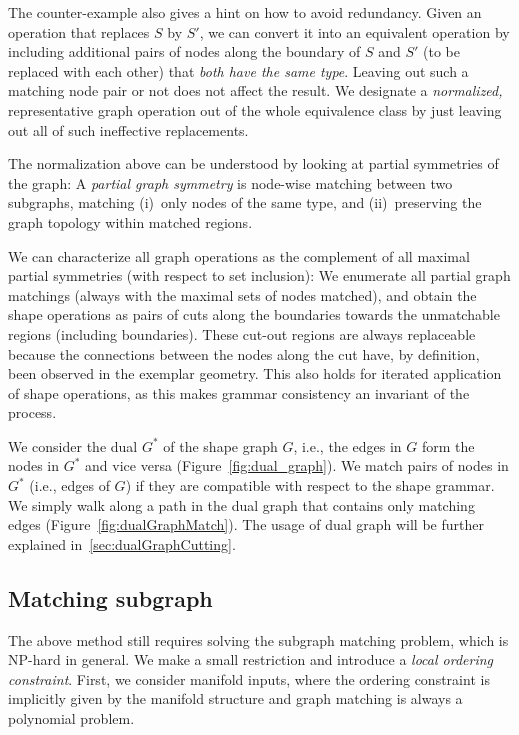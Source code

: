 The counter-example also gives a hint on how to avoid redundancy. Given an operation that replaces $S$ by $S'$, we can convert it into an equivalent operation by including additional pairs of nodes along the boundary of $S$ and $S'$ (to be replaced with each other) that \emph{both have the same type}. Leaving out such a matching node pair or not does not affect the result. We designate a \emph{normalized,} representative graph operation out of the whole equivalence class by just leaving out all of such ineffective replacements.


 The normalization above can be understood by looking at partial symmetries of the graph: A \emph{partial graph symmetry} is node-wise matching between two subgraphs, matching (i)~only nodes of the same type, and (ii)~preserving the graph topology within  matched regions.


We can characterize all graph operations as the complement of all maximal partial symmetries (with respect to set inclusion): We enumerate all partial graph matchings (always with the maximal sets of nodes matched), and obtain the shape operations as pairs of cuts along the boundaries towards the unmatchable regions (including boundaries).
%
These cut-out regions are always replaceable because the connections between the nodes along the cut have, by definition, been observed in the exemplar geometry. This also holds for iterated application of shape operations, as this makes grammar consistency an invariant of the process.

We consider the dual $G^*$ of the shape graph $G$, i.e., the edges in $G$ form the nodes in $G^*$ and vice versa (Figure~\ref{fig:dual_graph}). We match pairs of nodes in $G^*$ (i.e., edges of $G$) if they are compatible with respect to the shape grammar. We simply walk along a path in the dual graph that contains only matching edges (Figure~\ref{fig:dualGraphMatch}). The usage of dual graph will be further explained in~\ref{sec:dualGraphCutting}.

\subsection{Matching subgraph}

The above method still requires solving the subgraph matching problem, which is NP-hard in general.
We make a small restriction and introduce a \emph{local ordering constraint}. First, we consider manifold inputs, where the ordering constraint is implicitly given by the manifold structure and graph matching is always a polynomial problem.


